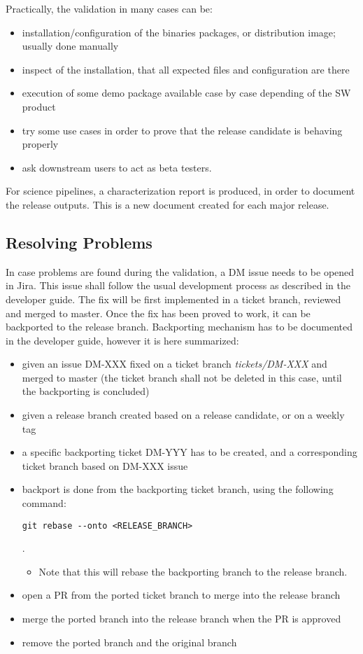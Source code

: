 Practically, the validation in many cases can be:

\begin{itemize}
\item installation/configuration of the binaries packages, or distribution image; usually done manually
\item inspect of the installation, that all expected files and configuration are there
\item execution of some demo package available case by case depending of the SW product
\item try some use cases in order to prove that the release candidate is behaving properly
\item ask downstream users to act as beta testers.
\end{itemize}

For science pipelines, a characterization report is produced, in order to document the release outputs.
This is a new document created for each major release.


\subsection{Resolving Problems}

In case problems are found during the validation, a DM issue needs to be opened in Jira.
This issue shall follow the usual development process as described in the developer guide. 
The fix will be first implemented in a ticket branch, reviewed and merged to master.
Once the fix has been proved to work, it can be backported to the release branch. 
Backporting mechanism has to be documented in the developer guide, however it is here summarized:

\begin{itemize}
\item given an issue DM-XXX fixed on a ticket branch \textit{tickets/DM-XXX} and merged to master (the ticket branch shall not be deleted in this case, until the backporting is concluded)
\item given a release branch created based on a release candidate, or on a weekly tag
\item a specific backporting ticket DM-YYY has to be created, and a corresponding ticket branch based on DM-XXX issue
\item backport is done from the backporting ticket branch, using the following command: \begin{verbatim}git rebase --onto <RELEASE_BRANCH>\end{verbatim} . 
\begin{itemize}
\item Note that this will rebase the backporting branch to the release branch.
\end{itemize}
\item open a PR from the ported ticket branch to merge into the release branch
\item merge the ported branch into the release branch when the PR is approved
\item remove the ported branch and the original branch
\end{itemize}

